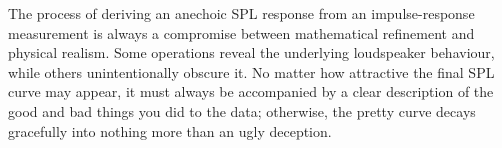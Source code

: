 \documentclass[12pt,a4paper]{article}
\begin{document}
The process of deriving an anechoic SPL response from an impulse-response measurement is always a compromise between mathematical refinement and physical realism. Some operations reveal the underlying loudspeaker behaviour, while others unintentionally obscure it. No matter how attractive the final SPL curve may appear, it must always be accompanied by a clear description of the good and bad things you did to the data; otherwise, the pretty curve decays gracefully into nothing more than an ugly deception.
\end{document}
